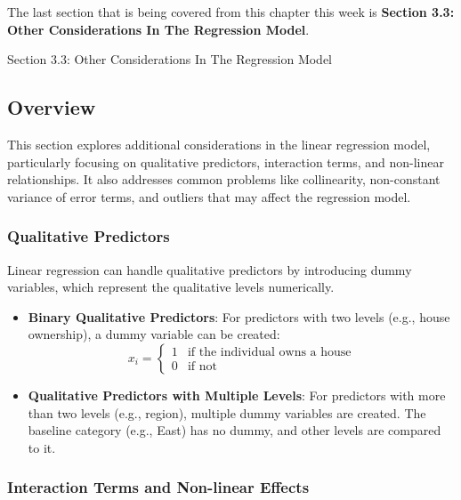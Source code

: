 The last section that is being covered from this chapter this week is \textbf{Section 3.3: Other Considerations In The Regression Model}.

\begin{notes}{Section 3.3: Other Considerations In The Regression Model}
    \subsection*{Overview}

    This section explores additional considerations in the linear regression model, particularly focusing on qualitative predictors, interaction terms, and non-linear relationships. It also addresses 
    common problems like collinearity, non-constant variance of error terms, and outliers that may affect the regression model.
    
    \subsubsection*{Qualitative Predictors}
    
    Linear regression can handle qualitative predictors by introducing dummy variables, which represent the qualitative levels numerically.
    
    \begin{highlight}
        \begin{itemize}
            \item \textbf{Binary Qualitative Predictors}: For predictors with two levels (e.g., house ownership), a dummy variable can be created:
            \[
            x_i = 
            \begin{cases}
                1 & \text{if the individual owns a house} \\
                0 & \text{if not}
            \end{cases}
            \]
            \item \textbf{Qualitative Predictors with Multiple Levels}: For predictors with more than two levels (e.g., region), multiple dummy variables are created. The baseline category (e.g., East) 
            has no dummy, and other levels are compared to it.
        \end{itemize}
    \end{highlight}
    
    \subsubsection*{Interaction Terms and Non-linear Effects}
    

\end{notes}
